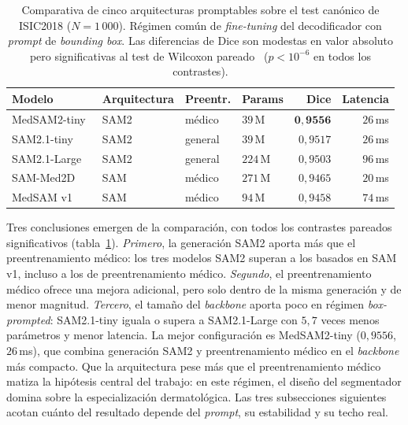 \begin{table}[htbp]
\centering
\footnotesize
\setlength{\tabcolsep}{4pt}
\renewcommand{\arraystretch}{0.95}
\caption{Comparativa de cinco arquitecturas promptables sobre el
test canónico de ISIC2018 ($N = 1\,000$). Régimen común de
\emph{fine-tuning} del decodificador con \emph{prompt} de
\emph{bounding box}. Las diferencias de Dice son modestas en valor
absoluto pero significativas al test de Wilcoxon
pareado~\cite{wilcoxon1945}
($p < 10^{-6}$ en todos los contrastes).}
\label{tab:seg-arquitecturas}
\begin{tabular}{llllrr}
\hline
Modelo            & Arquitectura       & Preentr. & Params & Dice & Latencia \\
\hline
MedSAM2-tiny~\cite{medsam2} & SAM2~\cite{sam2}   & médico   & $39$\,M  & $\mathbf{0{,}9556}$ & $26$\,ms \\
SAM2.1-tiny       & SAM2~\cite{sam2}   & general  & $39$\,M  & $0{,}9517$ & $26$\,ms \\
SAM2.1-Large      & SAM2~\cite{sam2}   & general  & $224$\,M & $0{,}9503$ & $96$\,ms \\
SAM-Med2D~\cite{sammed2d} & SAM~\cite{sam2023} & médico   & $271$\,M & $0{,}9465$ & $20$\,ms \\
MedSAM v1~\cite{medsam}   & SAM~\cite{sam2023} & médico   & $94$\,M  & $0{,}9458$ & $74$\,ms \\
\hline
\end{tabular}
\end{table}

Tres conclusiones emergen de la comparación, con todos los contrastes
pareados significativos (tabla~\ref{tab:seg-arquitecturas}).
\textit{Primero}, la generación
SAM2 aporta más que el preentrenamiento médico: los tres modelos SAM2
superan a los basados en SAM v1, incluso a los de preentrenamiento
médico. \textit{Segundo}, el preentrenamiento médico ofrece una mejora
adicional, pero solo dentro de la misma generación y de menor
magnitud. \textit{Tercero}, el tamaño del \emph{backbone} aporta poco
en régimen \emph{box-prompted}: SAM2.1-tiny iguala o supera a
SAM2.1-Large con $5{,}7$ veces menos parámetros y menor latencia. La
mejor configuración es MedSAM2-tiny ($0{,}9556$, $26$\,ms), que
combina generación SAM2 y preentrenamiento médico en el
\emph{backbone} más compacto. Que la arquitectura pese más que el
preentrenamiento médico matiza la hipótesis central del trabajo: en
este régimen, el diseño del segmentador domina sobre la
especialización dermatológica. Las tres subsecciones siguientes acotan
cuánto del resultado depende del \emph{prompt}, su estabilidad y su
techo real.

